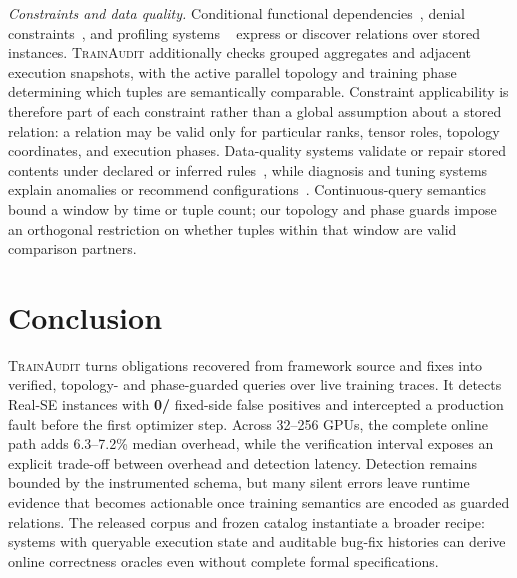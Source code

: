 \documentclass[sigconf,nonacm]{acmart}
\begin{document}
\emph{Constraints and data quality.}
Conditional functional dependencies~\cite{fan2008cfd}, denial
constraints~\cite{chu2013discovering}, and profiling systems
~\cite{papenbrock2015functional,pena2019dcfinder} express or discover relations
over stored instances. \textsc{TrainAudit} additionally checks grouped
aggregates and adjacent execution snapshots, with the active parallel topology
and training phase determining which tuples are semantically comparable.
Constraint applicability is therefore part of each constraint rather than a
global assumption about a stored relation: a relation may be valid only for
particular ranks, tensor roles, topology coordinates, and execution phases.
Data-quality systems validate or repair stored contents under declared or
inferred rules~\cite{dallachiesa2013nadeef,schelter2018deequ,
song2021autovalidate,chen2025autotest,mahdavi2019raha,
rekatsinas2017holoclean}, while diagnosis and tuning systems explain anomalies
or recommend configurations~\cite{yoon2016dbsherlock,zhou2024dbot,
tang2024gptuner}. Continuous-query semantics~\cite{arasu2006cql} bound a window
by time or tuple count; our topology and phase guards impose an orthogonal
restriction on whether tuples within that window are valid comparison partners.

\section{Conclusion}
\label{sec:conclusion}

\textsc{TrainAudit} turns obligations recovered from framework source and fixes
into verified, topology- and phase-guarded queries over live training traces.
It detects \textbf{\RealSEDetFrac} Real-SE instances with
\textbf{0/\NumFixedReplay} fixed-side false positives and intercepted a
production fault before the first optimizer step. Across 32--256 GPUs, the
complete online path adds 6.3--7.2\% median overhead, while the verification
interval exposes an explicit trade-off between overhead and detection latency.
Detection remains bounded by the instrumented schema, but many silent errors leave runtime evidence that
becomes actionable once training semantics are encoded as guarded relations.
The released corpus and frozen catalog instantiate a broader recipe: systems
with queryable execution state and auditable bug-fix histories can derive
online correctness oracles even without complete formal specifications.




\end{document}

